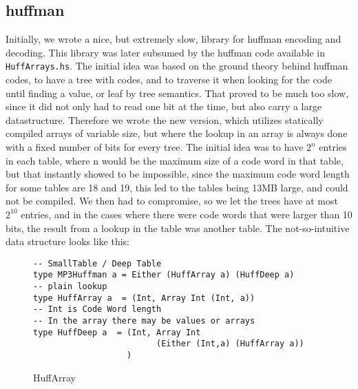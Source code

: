 \documentclass[a4paper,12pt]{article}
\begin{document}
    \subsection{huffman}
    \label{sec:huffman}
        Initially, we wrote a nice, but extremely slow, library for huffman
        encoding and decoding. This library was later subsumed by the huffman
        code available in \texttt{HuffArrays.hs}. The initial idea was based on the
        ground theory behind huffman codes, to have a tree with codes, and to
        traverse it when looking for the code until finding a value, or leaf by
        tree semantics. That proved to be much too slow, since it did not only
        had to read one bit at the time, but also carry a large datastructure.
        Therefore we wrote the new version, which utilizes statically compiled
        arrays of variable size, but where the lookup in an array is always done
        with a fixed number of bits for every tree. The initial idea was to have
        $2^n$ entries in each table, where n would be the maximum size of a code
        word in that table, but that instantly showed to be impossible, since
        the maximum code word length for some tables are 18 and 19, this led to
        the tables being 13MB large, and could not be compiled. We then had to
        compromise, so we let the trees have at most $2^{10}$ entries, and in
        the cases where there were code words that were larger than 10 bits, the
        result from a lookup in the table was another table. The
        not-so-intuitive data structure looks like this:
\begin{figure}[H]
  \begin{center}
        \begin{lstlisting}
-- SmallTable / Deep Table
type MP3Huffman a = Either (HuffArray a) (HuffDeep a)
-- plain lookup
type HuffArray a  = (Int, Array Int (Int, a))
-- Int is Code Word length
-- In the array there may be values or arrays
type HuffDeep a  = (Int, Array Int
                         (Either (Int,a) (HuffArray a))
                   )
        \end{lstlisting}
    \caption{HuffArray}\label{fig:huffarraycode}
  \end{center}
\end{figure}
\end{document}
